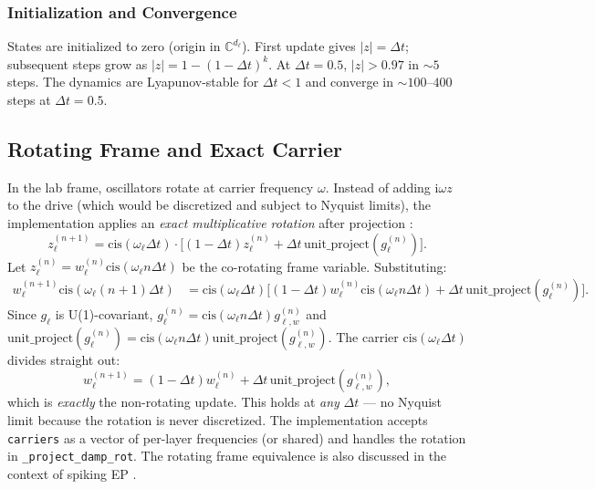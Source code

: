 \documentclass[11pt]{article}
\newcommand{\C}{\mathbb{C}}
\newcommand{\im}{\mathrm{i}}
\newcommand{\dt}{\Delta t}
\newcommand{\unitproject}{\mathrm{unit\_project}}
\begin{document}
\subsubsection{Initialization and Convergence}
States are initialized to zero (origin in $\C^{d_\ell}$). First update gives $|z| = \dt$; subsequent steps grow as $|z| = 1 - (1-\dt)^k$. At $\dt=0.5$, $|z| > 0.97$ in $\sim 5$ steps. The dynamics are Lyapunov-stable for $\dt < 1$ and converge in $\sim 100$--$400$ steps at $\dt=0.5$.

\subsection{Rotating Frame and Exact Carrier}\label{sec:rotating-frame}

In the lab frame, oscillators rotate at carrier frequency $\omega$. Instead of adding $\im\omega z$ to the drive (which would be discretized and subject to Nyquist limits), the implementation applies an \emph{exact multiplicative rotation} after projection \citep{olin2021deep}:
\begin{equation}
z_{\ell}^{(n+1)} = \mathrm{cis}(\omega_\ell \dt) \cdot \Big[ (1-\dt)z_\ell^{(n)} + \dt\, \unitproject(g_\ell^{(n)}) \Big].
\end{equation}
Let $z_\ell^{(n)} = w_\ell^{(n)} \mathrm{cis}(\omega_\ell n\dt)$ be the co-rotating frame variable. Substituting:
\begin{align}
w_\ell^{(n+1)}\mathrm{cis}(\omega_\ell (n+1)\dt)
&= \mathrm{cis}(\omega_\ell \dt) \Big[ (1-\dt)w_\ell^{(n)}\mathrm{cis}(\omega_\ell n\dt) + \dt\, \unitproject(g_\ell^{(n)}) \Big].
\end{align}
Since $g_\ell$ is U(1)-covariant, $g_\ell^{(n)} = \mathrm{cis}(\omega_\ell n\dt) g_{\ell,w}^{(n)}$ and $\unitproject(g_\ell^{(n)}) = \mathrm{cis}(\omega_\ell n\dt) \unitproject(g_{\ell,w}^{(n)})$. The carrier $\mathrm{cis}(\omega_\ell \dt)$ divides straight out:
\begin{equation}
w_\ell^{(n+1)} = (1-\dt)w_\ell^{(n)} + \dt\, \unitproject(g_{\ell,w}^{(n)}),
\end{equation}
which is \emph{exactly} the non-rotating update. This holds at \emph{any} $\dt$ — no Nyquist limit because the rotation is never discretized. The implementation accepts \texttt{carriers} as a vector of per-layer frequencies (or shared) and handles the rotation in \texttt{\_project\_damp\_rot}. The rotating frame equivalence is also discussed in the context of spiking EP \citep{olin2021deep}.
\end{document}
